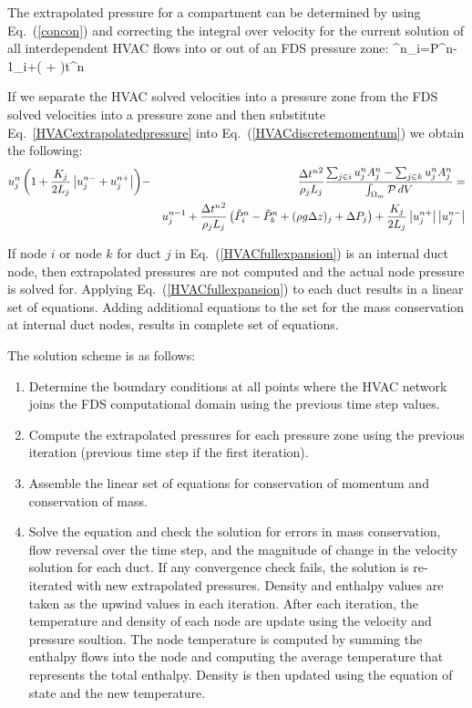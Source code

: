 The extrapolated pressure for a compartment can be determined by using Eq.~(\ref{concon}) and correcting the integral over velocity for the current solution of
all interdependent HVAC flows into or out of an FDS pressure zone:
\be {}^n_i=P^{n-1}_i+\left( + \right)\Delta t^n
   \label{HVACextrapolatedpressure} \ee

If we separate the HVAC solved velocities into a pressure zone from the FDS solved velocities into a pressure zone and then substitute Eq.~\ref{HVACextrapolatedpressure} into
Eq.~(\ref{HVACdiscretemomentum}) we obtain the following:
\begin{eqnarray}
   u^n_j \left( 1+\frac{K_j}{2 L_j} \left| u^{n-}_j+u^{n+}_j \right| \right) &-&
    \frac{\Delta {t^n}^2}{\rho_j L_j} \frac{{\sum_{j\in i} u^n_j A^n_j}-{\sum_{j\in k} u^n_j A^n_j}}{{\int_{\Omega_m} {\cal P} \, dV}}= \nonumber \\
  & & u^{n-1}_j+ \frac{\Delta {t^n}^2}{\rho_j L_j}
  \left(\tilde{P}^n_i-\tilde{P}^n_k +  (\rho g \Delta z)_j + \Delta P_j \right) +
  \frac{K_j}{2 L_j}\left|u^{n+}_j\right| \left|u^{n-}_j\right| \label{HVACfullexpansion}
\end{eqnarray}

If node $i$ or node $k$ for duct $j$ in Eq.~(\ref{HVACfullexpansion}) is an internal duct node, then extrapolated pressures are not computed and the actual node pressure is solved for.
Applying Eq.~(\ref{HVACfullexpansion}) to each duct results in a linear set of equations.
Adding additional equations to the set for the mass conservation at internal duct nodes, results in complete set of equations.

The solution scheme is as follows:

\begin{enumerate}
\item Determine the boundary conditions at all points where the HVAC network joins the FDS computational domain using the previous time step values.
\item Compute the extrapolated pressures for each pressure zone using the previous iteration (previous time step if the first iteration).
\item Assemble the linear set of equations for conservation of momentum and conservation of mass.
\item Solve the equation and check the solution for errors in mass conservation, flow reversal over the time step, and the magnitude of change in the velocity solution for each duct.  If any convergence check fails, the solution is re-iterated with new extrapolated pressures.  Density and enthalpy values are taken as the upwind values in each iteration.  After each iteration, the temperature and density of each node are update using the velocity and pressure soultion.  The node temperature is computed by summing the enthalpy flows into the node and computing the average temperature that represents the total enthalpy.  Density is then updated using the equation of state and the new temperature.
\end{enumerate}

